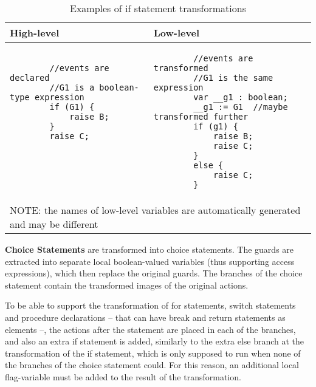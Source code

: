 \begin{table}[ht]
	\footnotesize
	\centering
	\begin{tabular}{ p{7cm} p{7cm} }
		\toprule
		High-level & Low-level \\
		\midrule
		\begin{lstlisting}
		//events are declared
		//G1 is a boolean-type expression
		if (G1) {
			raise B;
		}
		raise C;
		
		
		
		
		\end{lstlisting} & 
		\begin{lstlisting}
		//events are transformed
		//G1 is the same expression
		var __g1 : boolean;
		__g1 := G1	//maybe transformed further
		if (g1) {
			raise B;
			raise C;
		}
		else {
			raise C;
		}\end{lstlisting} \\
		\bottomrule
		\multicolumn{2}{l}{NOTE: the names of low-level variables are automatically generated and may be different}
	\end{tabular}
	\caption{Examples of if statement transformations}
	\label{tab:SCLLIfStatementExample}
\end{table}

\bigskip
\textbf{Choice Statements} are transformed into choice statements. The guards are extracted into separate local boolean-valued variables (thus supporting access expressions), which then replace the original guards. The branches of the choice statement contain the transformed images of the original actions. 

To be able to support the transformation of for statements, switch statements and procedure declarations -- that can have break and return statements as elements --, the actions after the statement are placed in each of the branches, and also an extra if statement is added, similarly to the extra else branch at the transformation of the if statement, which is only supposed to run when none of the branches of the choice statement could. For this reason, an additional local flag-variable must be added to the result of the transformation.


